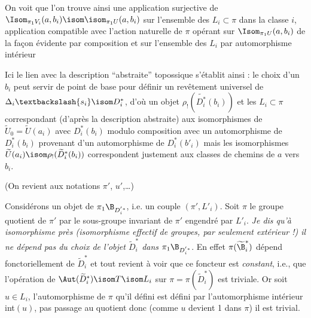 
On voit que l'on trouve ainsi une application surjective de $\Isom_{\pi_1 V_i}(a, b_i) \isom \isom_{\pi_1 U}(a, b_i)$ sur l'ensemble des $L_i \subset  \pi$ dans la classe $i$, application compatible avec l'action naturelle de $\pi$ opérant sur $\Isom_{\pi_1 U}(a, b_i)$ de la fa\c{c}on évidente par composition et sur l'ensemble des $L_i$ par automorphisme intérieur

Ici le lien avec la description ``abstraite'' topossique s'établit ainsi : le choix d'un $b_i$ peut servir de point de base pour définir un revêtement universel de $\Delta_i \textbackslash \{ s_i \} \isom D^*_i$, d'où un objet $\rho_! (\widetilde{D^*_i}(b_i))$ et les $L_i \subset  \pi$ correspondant (d'après la description abstraite) aux isomorphismes de $\widetilde{U}_0 = \widetilde{U}(a_i)$ avec $D^*_i (b_i)$ modulo composition avec un automorphisme de $D^*_i (b_i)$ provenant d'un automorphisme de $D^*_i(b'_i)$ mais les isomorphismes $\widetilde{U}(a_i) \isom \rho_! (\widetilde{D}^*_i(b_i))$ correspondent justement aux classes de chemins de $a$ vers $b_i$.

(On revient aux notations $\pi'$, $u'$,\dots)

Considérons un objet de $\pi_1 \B_{D^{'*}_i}$, i.e. un couple $(\pi', L'_i)$. Soit $\pi$ le groupe quotient de $\pi'$ par le sous-groupe invariant de $\pi'$ engendré par $L'_i$. \emph{Je dis qu'à isomorphisme près (isomorphisme effectif de groupes, par seulement extérieur !) il ne dépend pas du choix de l'objet $\widetilde{D}^*_i$ dans $\pi_1 \B_{D^{'*}_i}$}. En effet $\pi (\widetilde{\B}^*_i)$ dépend fonctoriellement de  $\widetilde{D}^*_i$ et tout revient à voir que ce foncteur est \emph{constant}, i.e., que l'opération de $\Aut(\widetilde{D}^*_i) \isom T \isom L_i$ sur $\pi = \pi (\widetilde{D}^*_i)$ est triviale. Or soit $u \in L_i$, l'automorphisme de $\pi$ qu'il défini est défini par l'automorphisme intérieur int$(u)$, pas passage au quotient donc (comme $u$ devient 1 dans $\pi$) il est trivial.

